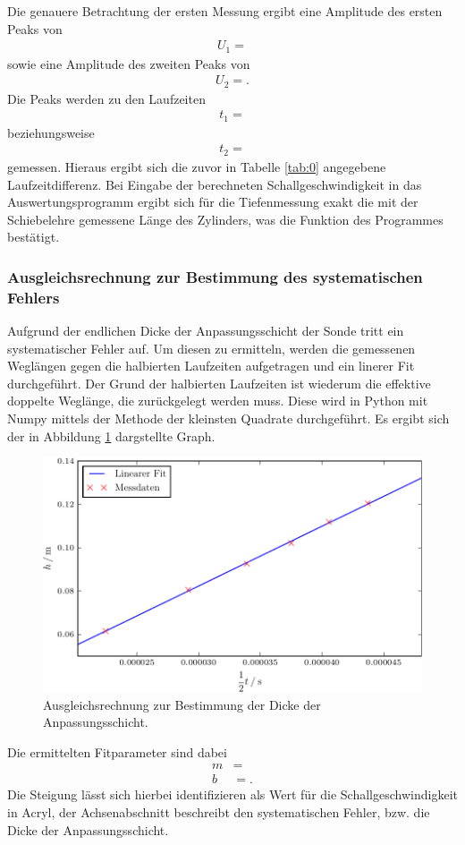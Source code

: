 Die genauere Betrachtung der ersten Messung ergibt eine Amplitude des ersten Peaks von
\begin{align*}
  U_1 = 
\end{align*}
sowie eine Amplitude des zweiten Peaks von
\begin{align*}
  U_2 = .
\end{align*}
Die Peaks werden zu den Laufzeiten
\begin{align*}
  t_1 = 
\end{align*}
beziehungsweise
\begin{align*}
  t_2 = 
\end{align*}
gemessen.
Hieraus ergibt sich die zuvor in Tabelle \ref{tab:0} angegebene Laufzeitdifferenz.
Bei Eingabe der berechneten Schallgeschwindigkeit in das Auswertungsprogramm ergibt sich für die Tiefenmessung exakt die mit der Schiebelehre gemessene Länge des Zylinders, was die Funktion des Programmes bestätigt. %

\subsubsection{Ausgleichsrechnung zur Bestimmung des systematischen Fehlers}
Aufgrund der endlichen Dicke der Anpassungsschicht der Sonde tritt ein systematischer Fehler auf.
Um diesen zu ermitteln, werden die gemessenen Weglängen gegen die halbierten Laufzeiten aufgetragen und ein linerer Fit durchgeführt.
Der Grund der halbierten Laufzeiten ist wiederum die effektive doppelte Weglänge, die zurückgelegt werden muss.
Diese wird in Python mit Numpy mittels der Methode der kleinsten Quadrate durchgeführt.
Es ergibt sich der in Abbildung \ref{fig:plot1} dargstellte Graph.
\begin{figure}
  \centering
  \includegraphics{build/ausgleich.pdf}
  \caption{Ausgleichsrechnung zur Bestimmung der Dicke der Anpassungsschicht.}
  \label{fig:plot1}
\end{figure}
Die ermittelten Fitparameter sind dabei
\begin{align*}
  m &=  \\
  b &= .
\end{align*}
Die Steigung lässt sich hierbei identifizieren als Wert für die Schallgeschwindigkeit in Acryl, der Achsenabschnitt beschreibt den systematischen Fehler, bzw. die Dicke der Anpassungsschicht.

